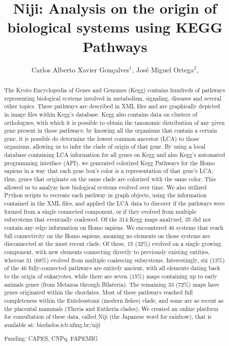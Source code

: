 \documentclass[twoside]{article}
\title{\vspace{-15mm}\fontsize{24pt}{10pt}\selectfont\textbf{ Niji: Analysis on the origin of biological systems using KEGG Pathways }} %
\author{ Carlos Alberto Xavier Gonçalves$^{1}$, José Miguel Ortega$^{2}$, }
\affil{ 1 UFMG

2 Universidade Federal de Minas Gerais. Laboratório de Biodados

 }
\date{}
\begin{document}
  
  
  \maketitle %
  
  
  \thispagestyle{fancy} %
  
  
  \begin{abstract}
  The Kyoto Encyclopedia of Genes and Genomes (Kegg) contains hundreds of pathways representing biological systems involved in metabolism, signaling, diseases and several other topics. These pathways are described in XML files and are graphically depicted in image files within Kegg’s database. Kegg also contains data on clusters of orthologues, with which it is possible to obtain the taxonomic distribution of any given gene present in those pathways; by knowing all the organisms that contain a certain gene, it is possible do determine the lowest common ancestor (LCA) to those organisms, allowing us to infer the clade of origin of that gene. By using a local database containing LCA information for all genes on Kegg and also Kegg’s automated programming interface (API), we generated colorized Kegg Pathways for the Homo sapiens in a way that each gene box’s color is a representation of that gene’s LCA; thus, genes that originate on the same clade are colorized with the same color. This allowed us to analyze how biological systems evolved over time. We also utilized Python scripts to recreate each pathway in graph objects, using the information contained in the XML files, and applied the LCA data to discover if the pathways were formed from a single connected component, or if they evolved from multiple subsystems that eventually coalesced. Of the 314 Kegg maps analyzed, 35 did not contain any edge information on Homo sapiens. We encountered 46 systems that reach full connectivity on the Homo sapiens, meaning no elements on those systems are disconnected at the most recent clade. Of these, 15 (32\%) evolved on a single growing component, with new elements connecting directly to previously existing entities, whereas 31 (68\%) evolved from multiple coalescing subsystems. Interestingly, six (13\%) of the 46 fully-connected pathways are entirely ancient, with all elements dating back to the origin of eukaryotes, while there are seven (15\%) maps containing up to early animals genes (from Metazoa through Bilateria). The remaining 33 (72\%) maps have genes originated within the chordates. Most of these pathways reached full completeness within the Euteleostomi (modern fishes) clade, and some are as recent as the placental mammals (Theria and Eutheria clades). We created an online platform for consultation of these data, called Niji (the Japanese word for rainbow), that is available at: biodados.icb.ufmg.br/niji
  
  Funding: CAPES, CNPq, FAPEMIG \\ 
  \end{abstract}
  
\end{document}
